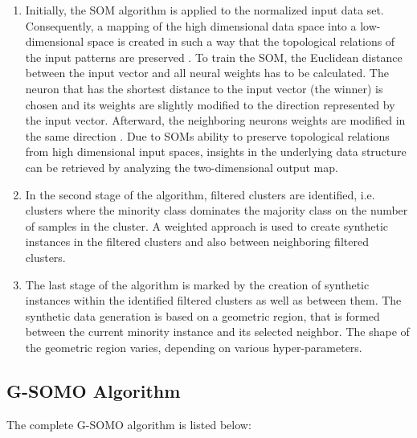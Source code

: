\documentclass[parskip=full]{scrartcl}
\begin{document}
\begin{enumerate}

	\item Initially, the SOM algorithm is applied to the normalized input data set. Consequently, a mapping of the high dimensional data space into a low-dimensional space is created in such a way that the topological relations of the input patterns are preserved \cite{Kker2007}. To train the SOM, the Euclidean distance between the input vector and all neural weights has to be calculated. The neuron that has the shortest distance to the input vector (the winner) is chosen and its weights are slightly modified to the direction represented by the input vector. Afterward, the neighboring neurons weights are modified in the same direction \cite{Brocki2007}. Due to SOMs ability to preserve topological
	relations from high dimensional input spaces, insights in the underlying data structure can be retrieved by analyzing the two-dimensional output map.

	\item In the second stage of the algorithm, filtered clusters are identified, i.e. clusters where the minority class dominates the majority class on the number of samples in the cluster. A weighted approach is used to create synthetic instances in the filtered clusters and also between neighboring filtered clusters.

	\item The last stage of the algorithm is marked by the creation of synthetic instances within the identified filtered clusters as well as between them. The synthetic data generation is based on a geometric region, that is formed between the current minority instance and its selected neighbor. The shape of the geometric region varies, depending on various hyper-parameters.

\end{enumerate}

\subsection{G-SOMO Algorithm}

The complete G-SOMO algorithm is listed below:
\end{document}
